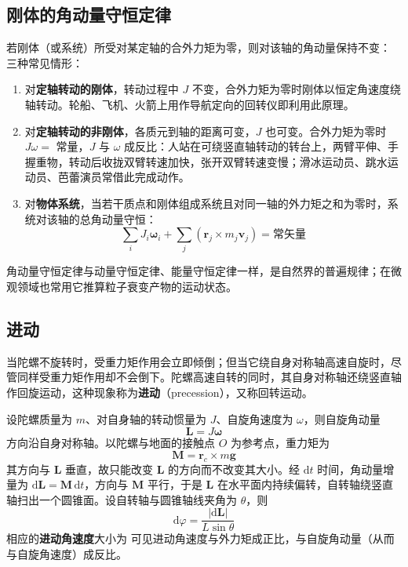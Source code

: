     \subsection{刚体的角动量守恒定律}
    若刚体（或系统）所受对某定轴的合外力矩为零，则对该轴的角动量保持不变：
    三种常见情形：
    \begin{enumerate}
        \item 对\textbf{定轴转动的刚体}，转动过程中 $J$ 不变，合外力矩为零时刚体以恒定角速度绕轴转动。轮船、飞机、火箭上用作导航定向的回转仪即利用此原理。
        \item 对\textbf{定轴转动的非刚体}，各质元到轴的距离可变，$J$ 也可变。合外力矩为零时 $J\omega=$ 常量，$J$ 与 $\omega$ 成反比：人站在可绕竖直轴转动的转台上，两臂平伸、手握重物，转动后收拢双臂转速加快，张开双臂转速变慢；滑冰运动员、跳水运动员、芭蕾演员常借此完成动作。
        \item 对\textbf{物体系统}，当若干质点和刚体组成系统且对同一轴的外力矩之和为零时，系统对该轴的总角动量守恒：
        \[
        \sum_{i}J_{i}\boldsymbol{\omega}_{i}+\sum_{j}\left(\boldsymbol{r}_{j}\times m_{j}\boldsymbol{v}_{j}\right)
        =\text{常矢量}
        \]
    \end{enumerate}
    角动量守恒定律与动量守恒定律、能量守恒定律一样，是自然界的普遍规律；在微观领域也常用它推算粒子衰变产物的运动状态。

    \subsection{进动}
    当陀螺不旋转时，受重力矩作用会立即倾倒；但当它绕自身对称轴高速自旋时，尽管同样受重力矩作用却不会倒下。陀螺高速自转的同时，其自身对称轴还绕竖直轴作回旋运动，这种现象称为\textbf{进动}（precession），又称回转运动。

    设陀螺质量为 $m$、对自身轴的转动惯量为 $J$、自旋角速度为 $\omega$，则自旋角动量
    \[
    \boldsymbol{L}=J\boldsymbol{\omega}
    \]
    方向沿自身对称轴。以陀螺与地面的接触点 $O$ 为参考点，重力矩为
    \[
    \boldsymbol{M}=\boldsymbol{r}_{c}\times m\boldsymbol{g}
    \]
    其方向与 $\boldsymbol{L}$ 垂直，故只能改变 $\boldsymbol{L}$ 的方向而不改变其大小。经 $\mathrm{d}t$ 时间，角动量增量为 $\mathrm{d}\boldsymbol{L}=\boldsymbol{M}\,\mathrm{d}t$，方向与 $\boldsymbol{M}$ 平行，于是 $\boldsymbol{L}$ 在水平面内持续偏转，自转轴绕竖直轴扫出一个圆锥面。设自转轴与圆锥轴线夹角为 $\theta$，则
    \[
    \mathrm{d}\varphi=\frac{|\mathrm{d}\boldsymbol{L}|}{L\sin\theta}
    \]
    相应的\textbf{进动角速度}大小为
    可见进动角速度与外力矩成正比，与自旋角动量（从而与自旋角速度）成反比。

